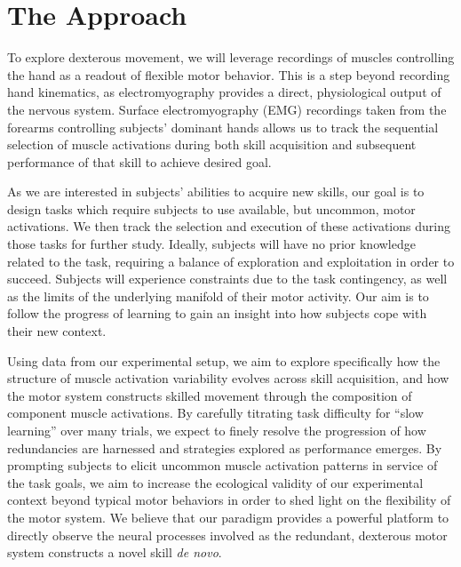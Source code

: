 \documentclass[../main.tex]{subfiles}
\begin{document}
\section{The Approach}

To explore dexterous movement, we will leverage recordings of muscles controlling the hand as a readout of flexible motor behavior. This is a step beyond recording hand kinematics, as electromyography provides a direct, physiological output of the nervous system. Surface electromyography (EMG) recordings taken from the forearms controlling subjects' dominant hands allows us to track the sequential selection of muscle activations during both skill acquisition and subsequent performance of that skill to achieve desired goal.

As we are interested in subjects' abilities to acquire new skills, our goal is to design tasks which require subjects to use available, but uncommon, motor activations. We then track the selection and execution of these activations during those tasks for further study. Ideally, subjects will have no prior knowledge related to the task, requiring a balance of exploration and exploitation in order to succeed. Subjects will experience constraints due to the task contingency, as well as the limits of the underlying manifold of their motor activity. Our aim is to follow the progress of learning to gain an insight into how subjects cope with their new context.

Using data from our experimental setup, we aim to explore specifically how the structure of muscle activation variability evolves across skill acquisition, and how the motor system constructs skilled movement through the composition of component muscle activations. By carefully titrating task difficulty for ``slow learning'' over many trials, we expect to finely resolve the progression of how redundancies are harnessed and strategies explored as performance emerges. By prompting subjects to elicit uncommon muscle activation patterns in service of the task goals, we aim to increase the ecological validity of our experimental context beyond typical motor behaviors in order to shed light on the flexibility of the motor system. We believe that our paradigm provides a powerful platform to directly observe the neural processes involved as the redundant, dexterous motor system constructs a novel skill \textit{de novo}.
\end{document}
